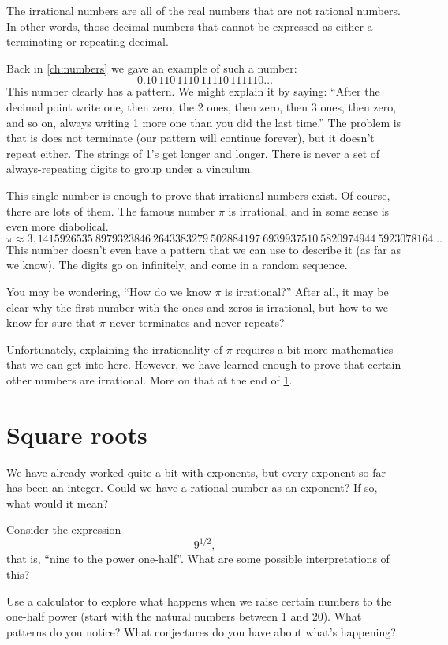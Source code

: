 The \glspl{irrational number} are all of the real numbers that are not rational numbers. In other words, those decimal numbers that cannot be expressed as either a terminating or repeating decimal.

Back in \cref{ch:numbers} we gave an example of such a number: \[0.10\,110\,1110\,11110\,111110\ldots\]
This number clearly has a pattern. We might explain it by saying: ``After the decimal point write one, then zero, the 2 ones, then zero, then 3 ones, then zero, and so on, always writing 1 more one than you did the last time.'' The problem is that is does not terminate (our pattern will continue forever), but it doesn't repeat either. The strings of 1's get longer and longer. There is never a set of always-repeating digits to group under a vinculum.

This single number is enough to prove that irrational numbers exist. Of course, there are lots of them. The famous number $\pi$ is irrational, and in some sense is even more diabolical.
\[\pi \approx 3. \, 1415926535 ~ 8979323846 ~ 2643383279 ~ 502884197 ~ 6939937510 ~ 5820974944 ~ 5923078164\ldots\]
This number doesn't even have a pattern that we can use to describe it (as far as we know). The digits go on infinitely, and come in a random sequence.

You may be wondering, ``How do we know $\pi$ is irrational?'' After all, it may be clear why the first number with the ones and zeros is irrational, but how to we know for sure that $\pi$ never terminates and never repeats?

Unfortunately, explaining the irrationality of $\pi$ requires a bit more mathematics that we can get into here. However, we have learned enough to prove that certain other numbers are irrational. More on that at the end of \cref{sec:radsquareroots}.

\section{Square roots}
\label{sec:radsquareroots}

We have already worked quite a bit with exponents, but every exponent so far has been an integer. Could we have a rational number as an exponent? If so, what would it mean?

\begin{boxexplore}
Consider the expression \[9^{1/2},\] that is, ``nine to the power one-half''. What are some possible interpretations of this?

Use a calculator to explore what happens when we raise certain numbers to the one-half power (start with the natural numbers between 1 and 20). What patterns do you notice? What conjectures do you have about what's happening?
\end{boxexplore}


